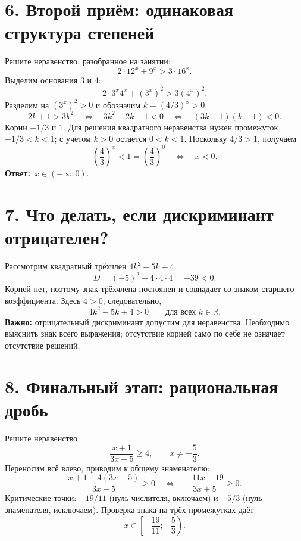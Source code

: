 \documentclass[a4paper,12pt]{article}
\newcommand{\idea}[1]{\textcolor{darkaccent}{\textbf{#1}}}
\newcommand{\ans}[1]{\textcolor{darkaccent}{\textbf{Ответ:}}\ #1}
\newcommand{\sect}[1]{\section*{\color{darkaccent}#1}}
\begin{document}
\sect{6. Второй приём: одинаковая структура степеней}
Решите неравенство, разобранное на занятии:
\[
 2\cdot12^x+9^x>3\cdot16^x.
\]
Выделим основания $3$ и $4$:
\[
 2\cdot3^x4^x+(3^x)^2>3(4^x)^2.
\]
Разделим на $(3^x)^2>0$ и обозначим $k=(4/3)^x>0$:
\[
 2k+1>3k^2
 \quad\Longleftrightarrow\quad 3k^2-2k-1<0
 \quad\Longleftrightarrow\quad (3k+1)(k-1)<0.
\]
Корни $-1/3$ и $1$. Для решения квадратного неравенства нужен промежуток $-1/3<k<1$; с учётом $k>0$ остаётся $0<k<1$.
Поскольку $4/3>1$, получаем
\[
 \left(\frac43\right)^x<1=\left(\frac43\right)^0
 \quad\Longleftrightarrow\quad x<0.
\]
\ans{$x\in(-\infty;0)$.}

\sect{7. Что делать, если дискриминант отрицателен?}
Рассмотрим квадратный трёхчлен $4k^2-5k+4$:
\[
 D=(-5)^2-4\cdot4\cdot4=-39<0.
\]
Корней нет, поэтому знак трёхчлена постоянен и совпадает со знаком старшего коэффициента. Здесь $4>0$, следовательно,
\[
 4k^2-5k+4>0\qquad\text{для всех }k\in\mathbb R.
\]
\idea{Важно:} отрицательный дискриминант допустим для неравенства. Необходимо выяснить знак всего выражения; отсутствие корней само по себе не означает отсутствие решений.

\clearpage
\sect{8. Финальный этап: рациональная дробь}
Решите неравенство
\[
 \frac{x+1}{3x+5}\ge4,\qquad x\ne-\frac53.
\]
Переносим всё влево, приводим к общему знаменателю:
\[
 \frac{x+1-4(3x+5)}{3x+5}\ge0
 \quad\Longleftrightarrow\quad
 \frac{-11x-19}{3x+5}\ge0.
\]
Критические точки: $-19/11$ (нуль числителя, включаем) и $-5/3$ (нуль знаменателя, исключаем). Проверка знака на трёх промежутках даёт
\[
 \displaystyle x\in\left[-\frac{19}{11};-\frac53\right).
\]
\clearpage
\end{document}
